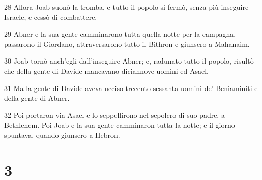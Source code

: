 \par 28 Allora Joab suonò la tromba, e tutto il popolo si fermò, senza più inseguire Israele, e cessò di combattere.
\par 29 Abner e la sua gente camminarono tutta quella notte per la campagna, passarono il Giordano, attraversarono tutto il Bithron e giunsero a Mahanaim.
\par 30 Joab tornò anch'egli dall'inseguire Abner; e, radunato tutto il popolo, risultò che della gente di Davide mancavano diciannove uomini ed Asael.
\par 31 Ma la gente di Davide aveva ucciso trecento sessanta uomini de' Beniaminiti e della gente di Abner.
\par 32 Poi portaron via Asael e lo seppellirono nel sepolcro di suo padre, a Bethlehem. Poi Joab e la sua gente camminaron tutta la notte; e il giorno spuntava, quando giunsero a Hebron.

\chapter{3}

